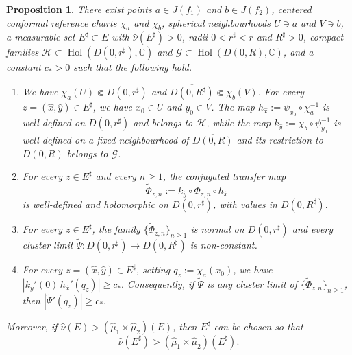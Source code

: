 \documentclass[11pt]{amsart}
\numberwithin{equation}{section}
\theoremstyle{plain}
\newtheorem{prop}[thm]{Proposition}
\theoremstyle{definition}
\theoremstyle{remark}
\begin{document}
\begin{prop}\label{prop:reference-charts}
There exist points
$a\in J(f_1)$ and $b\in J(f_2)$,
centered
conformal reference charts $\chi_a$ and $\chi_b$,
spherical neighbourhoods
$U\ni a$ and $V\ni b$,
a measurable set $E^\sharp\subset E$ with
$\hat\nu(E^\sharp)>0$,
radii $0<r^\sharp<r$ and $R^\sharp>0$, compact families
$\mathcal H
\subset
\operatorname{Hol}(D(0,r^\sharp),\mathbb C)$
and
$\mathcal G
\subset
\operatorname{Hol}(D(0,R),\mathbb C)$,
and a constant $c_*>0$ such that the following hold.

\begin{enumerate}
\item
We have
$
\overline{\chi_a(U)}
\Subset D(0,r^\sharp)$ and
$\overline{D(0,R^\sharp)}
\Subset
\chi_b(V)$.
For every
$z=(\hat x,\hat y)\in E^\sharp$, we have
$x_0\in U$ and $y_0\in V$. 
The map
$h_{\hat x}
:=
\psi_{x_0}\circ
\chi_a^{-1}$ 
is well-defined on $D(0,r^\sharp)$ and belongs to
$\mathcal H$, while the
map
$k_{\hat y}
:=
\chi_b\circ
\psi_{y_0}^{-1}$
is well-defined on a fixed
neighbourhood of $\overline{D(0,R)}$ and its restriction to
$D(0,R)$ belongs to $\mathcal G$.

\item
For every $z\in E^\sharp$ and every $n\geq1$, the conjugated transfer
map
$$
\widetilde\Phi_{z,n}
:=
k_{\hat y}\circ\Phi_{z,n}\circ h_{\hat x}
$$
is well-defined and holomorphic on $D(0,r^\sharp)$, with values in
$D(0,R^\sharp)$.

\item
For every $z\in E^\sharp$, the family
$\{\widetilde\Phi_{z,n}\}_{n\geq1}$ is normal on
$D(0,r^\sharp)$
and every cluster limit
$
\widetilde\Psi\colon
D(0,r^\sharp)\to D(0,R^\sharp)
$
is non-constant.

\item
For every
$z=(\hat x,\hat y)\in E^\sharp$, setting
$q_z:= \chi_a(x_0)$, we have
$
|
k_{\hat y}'(0)\,
h_{\hat x}'(q_z)
|
\geq c_*.
$
Consequently, if $\widetilde\Psi$ is any cluster limit of
$\{\widetilde\Phi_{z,n}\}_{n\geq1}$, then
$
|\widetilde\Psi'(q_z)|\geq c_*.
$
\end{enumerate}
Moreover, if
$\hat\nu(E)>
(\hat\mu_1\times\hat\mu_2)(E)$,
then $E^\sharp$ can be chosen so that
\begin{equation}\label{eq:25-extra}
\hat\nu(E^\sharp)>
(\hat\mu_1\times\hat\mu_2)(E^\sharp).
\end{equation}
\end{prop}
\end{document}
